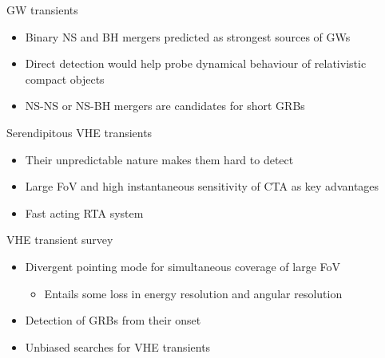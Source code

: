 \begin{frame}{GW transients}
  \begin{itemize}
    \item Binary NS and BH mergers predicted as strongest sources of GWs
    \item Direct detection would help probe dynamical behaviour of relativistic compact objects
    \item NS-NS or NS-BH mergers are candidates for short GRBs
  \end{itemize}
\end{frame}

\begin{frame}{Serendipitous VHE transients}
  \begin{itemize}
    \item Their unpredictable nature makes them hard to detect
    \item Large FoV and high instantaneous sensitivity of CTA as key advantages
    \item Fast acting RTA system
  \end{itemize}
\end{frame}

\begin{frame}{VHE transient survey}
  \begin{itemize}
    \item Divergent pointing mode for simultaneous coverage of large FoV
    \begin{itemize}
      \item [\to] Entails some loss in energy resolution and angular resolution
    \end{itemize}
    \item Detection of GRBs from their onset
    \item Unbiased searches for VHE transients
  \end{itemize}
\end{frame}
